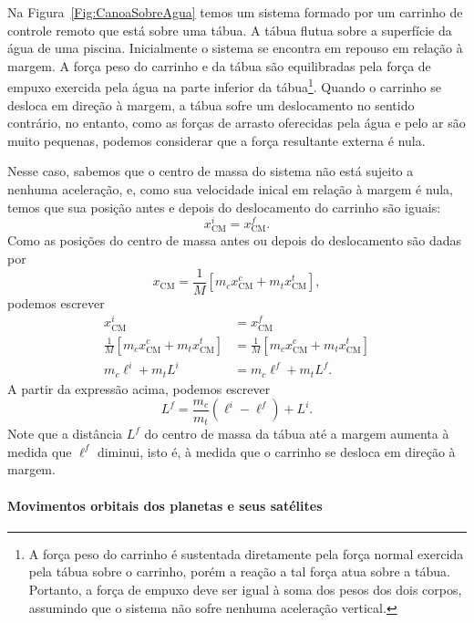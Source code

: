 Na Figura~\ref{Fig:CanoaSobreAgua} temos um sistema formado por um carrinho de controle remoto que está sobre uma tábua. A tábua flutua sobre a superfície da água de uma piscina. Inicialmente o sistema se encontra em repouso em relação à margem. A força peso do carrinho e da tábua são equilibradas pela força de empuxo exercida pela água na parte inferior da tábua\footnote{A força peso do carrinho é sustentada diretamente pela força normal exercida pela tábua sobre o carrinho, porém a reação a tal força atua sobre a tábua. Portanto, a força de empuxo deve ser igual à soma dos pesos dos dois corpos, assumindo que o sistema não sofre nenhuma aceleração vertical.}. Quando o carrinho se desloca em direção à margem, a tábua sofre um deslocamento no sentido contrário, no entanto, como as forças de arrasto oferecidas pela água e pelo ar são muito pequenas, podemos considerar que a força resultante externa é nula.

Nesse caso, sabemos que o centro de massa do sistema não está sujeito a nenhuma aceleração, e, como sua velocidade inical em relação à margem é nula, temos que sua posição antes e depois do deslocamento do carrinho são iguais:
\begin{equation}
    x_{\text{CM}}^i = x_{\textrm{CM}}^f.
\end{equation}
%
Como as posições do centro de massa antes ou depois do deslocamento são dadas por
\begin{equation}
    x_{\text{CM}} = \frac{1}{M} [m_c x_{\text{CM}}^{c} + m_t x_{\text{CM}}^t],
\end{equation}
%
podemos escrever
\begin{align}
    x_{\text{CM}}^i &= x_{\textrm{CM}}^f \\
    \frac{1}{M} [m_c x_{\text{CM}}^{c} + m_t x_{\text{CM}}^t] &= \frac{1}{M} [m_c x_{\text{CM}}^{c} + m_t x_{\text{CM}}^t] \\
    m_c \ell^i + m_t L^i &= m_c \ell^f + m_t L^f.
\end{align}
%
A partir da expressão acima, podemos escrever
\begin{equation}
    L^f = \frac{m_c}{m_t}(\ell^i - \ell^f) + L^i.
\end{equation}
%
Note que a distância $L^f$ do centro de massa da tábua até a margem aumenta à medida que $\ell^f$ diminui, isto é, à medida que o carrinho se desloca em direção à margem.

\paragraph{Movimentos orbitais dos planetas e seus satélites}

